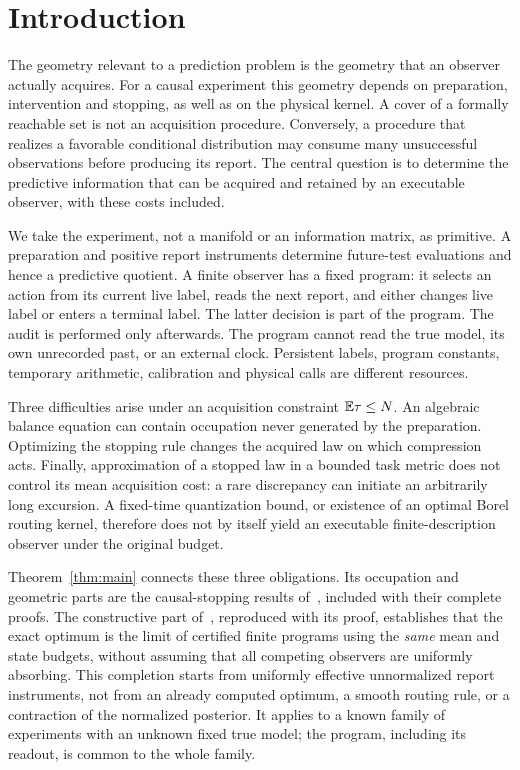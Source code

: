 \section{Introduction}
The geometry relevant to a prediction problem is the geometry that an observer actually acquires. For a causal experiment this geometry depends on preparation, intervention and stopping, as well as on the physical kernel. A cover of a formally reachable set is not an acquisition procedure. Conversely, a procedure that realizes a favorable conditional distribution may consume many unsuccessful observations before producing its report. The central question is to determine the predictive information that can be acquired and retained by an executable observer, with these costs included.

We take the experiment, not a manifold or an information matrix, as primitive. A preparation and positive report instruments determine future-test evaluations and hence a predictive quotient. A finite observer has a fixed program: it selects an action from its current live label, reads the next report, and either changes live label or enters a terminal label. The latter decision is part of the program. The audit is performed only afterwards. The program cannot read the true model, its own unrecorded past, or an external clock. Persistent labels, program constants, temporary arithmetic, calibration and physical calls are different resources.

Three difficulties arise under an acquisition constraint $\mathbb E\tau\le N$. An algebraic balance equation can contain occupation never generated by the preparation. Optimizing the stopping rule changes the acquired law on which compression acts. Finally, approximation of a stopped law in a bounded task metric does not control its mean acquisition cost: a rare discrepancy can initiate an arbitrarily long excursion. A fixed-time quantization bound, or existence of an optimal Borel routing kernel, therefore does not by itself yield an executable finite-description observer under the original budget.

Theorem~\ref{thm:main} connects these three obligations. Its occupation and geometric parts are the causal-stopping results of~\cite{GTFMean}, included with their complete proofs. The constructive part of~\cite{GTFExactBudget}, reproduced with its proof, establishes that the exact optimum is the limit of certified finite programs using the \emph{same} mean and state budgets, without assuming that all competing observers are uniformly absorbing. This completion starts from uniformly effective unnormalized report instruments, not from an already computed optimum, a smooth routing rule, or a contraction of the normalized posterior. It applies to a known family of experiments with an unknown fixed true model; the program, including its readout, is common to the whole family.


